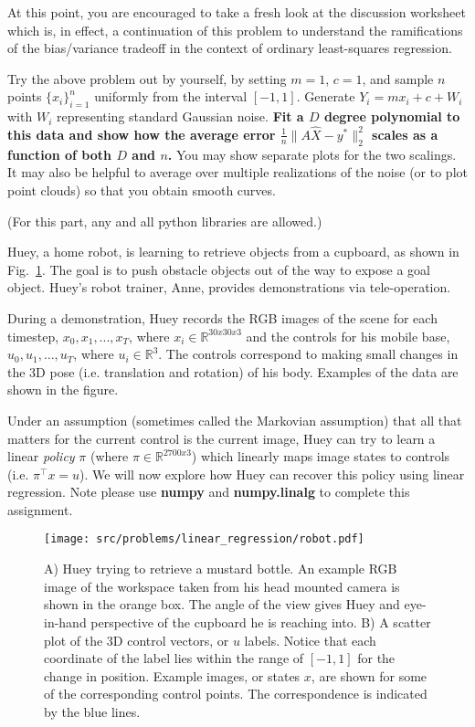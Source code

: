 \begin{Parts}
At this point, you are encouraged to take a fresh look at the
discussion worksheet which is, in effect, a continuation of this
problem to understand the ramifications of the bias/variance tradeoff
in the context of ordinary least-squares regression. 



\Part Try the above problem out by yourself, by setting $m = 1$, $c =
1$, and sample $n$ points $\{x_i\}_{i=1}^n$ uniformly from the
interval $[-1,1]$. Generate $Y_i = m x_i + c + W_i$ with $W_i$
representing standard Gaussian noise. {\bf Fit a $D$ degree polynomial
  to this data and show how the average error $\frac{1}{n} \| A
  \hat{X} - y^* \|_2^2$ scales as a function of both $D$ and $n$.} You
may show separate plots for the two scalings. It may also be helpful
to average over multiple realizations of the noise (or to plot point
clouds) so that you obtain smooth curves. 

(For this part, any and all python libraries are allowed.)

\end{Parts}

Huey, a home robot, is learning to retrieve objects from a cupboard, as shown in Fig.~\ref{fig:robot}. The goal is to push obstacle objects out of the way to expose a goal object.  Huey's robot trainer, Anne, provides demonstrations via tele-operation. 

During a demonstration, Huey records the RGB images of the scene for each timestep, $x_0,x_1,...,x_{T}$, where $x_i \in \mathbb{R}^{30x30x3}$ and the controls for his mobile base, $u_0,u_1,\ldots,u_{T}$, where $u_i \in \mathbb{R}^3$. The controls correspond to making small changes in the 3D pose (i.e. translation and rotation) of his body. Examples of the data are shown in the figure. 

Under an assumption (sometimes called the Markovian assumption) that all that matters for the current control is the current image, Huey can try to learn a linear \emph{policy} $\pi$ (where $\pi \in \mathbb{R}^{2700x3}$) which linearly maps image states to controls (i.e. $\pi^\top x =u$). We will now explore how Huey can recover this policy using linear regression. Note please use {\bf numpy} and {\bf numpy.linalg} to complete this assignment. 

\begin{figure}[h!]
    \begin{center}
    \texttt{[image: src/problems/linear\_regression/robot.pdf]}
    \caption{A) Huey trying to retrieve a mustard bottle. An example RGB image of the workspace taken from his head mounted camera is shown in the orange box. The angle of the view gives Huey and eye-in-hand perspective of the cupboard he is reaching into. B) A scatter plot of the 3D control vectors, or $u$ labels. Notice that each coordinate of the label lies within the range of $[-1,1]$ for the change in position. Example images, or states $x$, are shown for some of the corresponding control points. The correspondence is indicated by the blue lines.  } \label{fig:robot}
    \end{center}
\end{figure}

